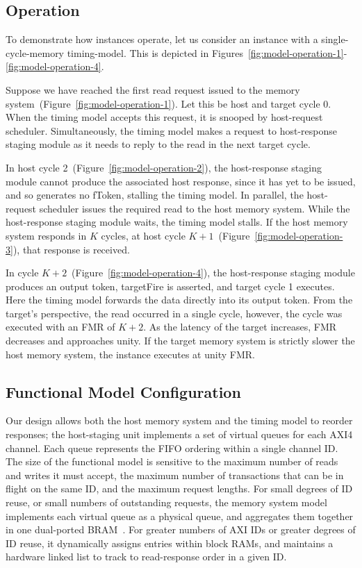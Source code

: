 \vspace{-0.251in}
\subsection{Operation}\label{sec:memory-model-operation}
To demonstrate how \PNAME instances operate, let us consider an instance with a
single-cycle-memory timing-model. This is depicted in Figures~\ref{fig:model-operation-1}-\ref{fig:model-operation-4}.

Suppose we have reached the first read request issued to the memory
system~(Figure~\ref{fig:model-operation-1}).  Let this be host and target cycle
0. When the timing model accepts this request, it is snooped by
host-request scheduler.  Simultaneously, the timing model makes a request
to host-response staging module as it needs to reply to the read in the next
target cycle.

In host cycle 2~(Figure~\ref{fig:model-operation-2}), the host-response staging module cannot produce
the associated host response, since it has yet to be issued, and so generates
no fToken, stalling the timing model. In parallel, the host-request scheduler
issues the required read to the host memory system.
While the host-response staging module waits, the timing model
stalls. If the host memory system responds in $K$ cycles, at host
cycle $K+1$~(Figure~\ref{fig:model-operation-3}), that response is received.

In cycle $K+2$~(Figure~\ref{fig:model-operation-4}), the host-response staging module produces an
output token, targetFire is asserted, and target cycle 1 executes. Here the
timing model forwards the data directly into its output token.
From the target's perspective, the read occurred in a single cycle, however,
the cycle was executed with an FMR of $K+2$.  As the latency of the
target increases, FMR decreases and approaches unity.  If the
target memory system is strictly slower the host memory system, the instance
executes at unity FMR.
\vspace{-0.10in}
\subsection{Functional Model Configuration}\label{egress}
Our design allows both the host memory system and the timing model to reorder
responses; the host-staging unit implements a set of virtual queues for each
AXI4 channel. Each queue represents the FIFO ordering within a single channel
ID. The size of the functional model is sensitive to the maximum number of reads
and writes it must accept, the maximum number of transactions that can be in
flight on the same ID, and the maximum request lengths. For small degrees of ID
reuse, or small numbers of outstanding requests, the memory system model
implements each virtual queue as a physical queue, and aggregates them together in one dual-ported
BRAM~\cite{LIFPGADesign}. For greater numbers of AXI IDs or greater degrees of ID
reuse, it dynamically assigns entries within block RAMs, and maintains a
hardware linked list to track to read-response order in a given ID.

